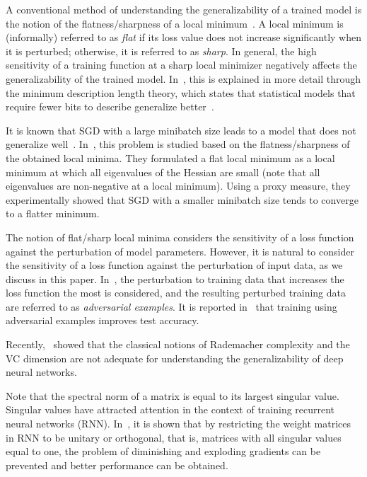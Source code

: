 A conventional method of understanding the generalizability of a trained model is the notion of the flatness/sharpness of a local minimum~\cite{Hochreiter:1997wf}. A local minimum is (informally) referred to as \emph{flat} if its loss value does not increase significantly when it is perturbed; otherwise, it is referred to as \emph{sharp}.
In general, the high sensitivity of a training function at a sharp local minimizer negatively affects the generalizability of the trained model. In~\cite{Hochreiter:1997wf}, this is explained in more detail through  the minimum description length  theory, which states that statistical models that require fewer bits to describe generalize better~\cite{Rissanen:1983fr}.

It is known that SGD with a large minibatch size leads to a model that does not generalize well~\cite{lecun2012efficient}. In~\cite{Keskar:2017tz}, this problem is studied based on the flatness/sharpness of the obtained local minima. They formulated a flat local minimum as a local minimum at which all eigenvalues of the Hessian are small (note that all eigenvalues are non-negative at a local minimum). Using a proxy measure, they experimentally showed that SGD with a smaller minibatch size tends to converge to a flatter minimum.

The notion of flat/sharp local minima considers the sensitivity of a loss function against the perturbation of model parameters. However, it is natural to consider the sensitivity of a loss function against the perturbation of input data, as we discuss in this paper. In~\cite{Szegedy:2014vw}, the perturbation to training data that increases the loss function the most is considered, and the resulting perturbed training data are referred to as \emph{adversarial examples}. It is reported in~\cite{Goodfellow:2015tl} that training using adversarial examples improves test accuracy.

Recently,~\cite{Zhang:2017te} showed that the  classical notions of Rademacher complexity and the VC  dimension are not adequate for understanding the generalizability of deep neural networks. 

Note that the spectral norm of a matrix is equal to its largest singular value. Singular values have attracted attention in the context of training recurrent neural networks (RNN). In~\cite{Arjovsky:2016tb,Wisdom:2016vk}, it is shown that by restricting the weight matrices in RNN to be unitary or orthogonal, that is, matrices with all singular values equal to one, the problem of diminishing and exploding gradients can be prevented and better performance  can be obtained.

